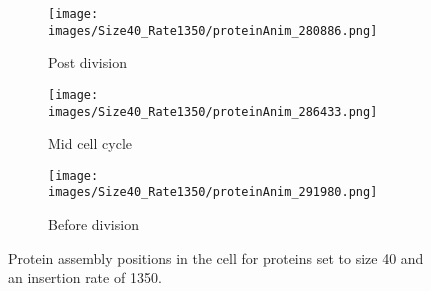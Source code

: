 \begin{figure}[h]
    \centering
    \begin{subfigure}[b]{\textwidth}
        \centering
        \texttt{[image: images/Size40\_Rate1350/proteinAnim\_280886.png]}
        \caption{Post division}
        \label{40_1350_post}
    \end{subfigure}
    \vfill
    \begin{subfigure}[b]{\textwidth}
        \centering
        \texttt{[image: images/Size40\_Rate1350/proteinAnim\_286433.png]}
        \caption{Mid cell cycle}
        \label{40_1350_mid}
    \end{subfigure}
    \vfill
    \begin{subfigure}[b]{\textwidth}
        \centering
        \texttt{[image: images/Size40\_Rate1350/proteinAnim\_291980.png]}
        \caption{Before division}
        \label{40_1350_pre}
    \end{subfigure}
    \caption{
    Protein assembly positions in the cell for proteins set to size 40 and an insertion rate of 1350.
    }
    \label{40_1350_cellcycle}
\end{figure}
